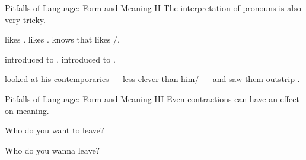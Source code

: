\documentclass[xcolor={usenames,svgnames,x11names,dvipsnames,table}]{beamer}
\begin{document}
\begin{frame}{Pitfalls of Language: Form and Meaning II}
    The interpretation of pronouns is also very tricky.

    \begin{exe}
        \small
        \ex
        \begin{xlist}
            \ex {} likes {}.
            \ex {} likes {}.
            \ex {} knows that  likes {}\slash {}.
        \end{xlist}
        \ex
        \begin{xlist}
            \ex {} introduced {} to .
            \ex {} introduced  to {}.
        \end{xlist}
        \ex {} looked at his contemporaries --- less clever than {\color<9->{orange}him}\slash {} --- and saw them outstrip {}.\phantom{\slash}
    \end{exe}
\end{frame}

\begin{frame}{Pitfalls of Language: Form and Meaning III}
    Even contractions can have an effect on meaning.

    \begin{exe}
        \small
        \ex Who do you want to leave?
    \end{exe}

    \begin{exe}
        \small
        \ex Who do you wanna leave?
    \end{exe}
\end{frame}
\end{document}
